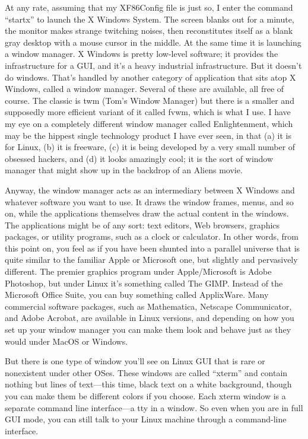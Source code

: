 \documentclass[
  fontsize=11pt,
  paper=landscape,
  twocolumn=true,
  pagesize=pdftex,
  headings=small,
  DIV=15,
  ]{scrartcl}
\begin{document}
At any rate, assuming that my XF86Config file is just so, I enter the
command ``startx'' to launch the X Windows System. The screen blanks out
for a minute, the monitor makes strange twitching noises, then
reconstitutes itself as a blank gray desktop with a mouse cursor in the
middle. At the same time it is launching a window manager. X Windows is
pretty low-level software; it provides the infrastructure for a GUI, and
it's a heavy industrial infrastructure. But it doesn't do windows.
That's handled by another category of application that sits atop X
Windows, called a window manager. Several of these are available, all
free of course. The classic is twm (Tom's Window Manager) but there is a
smaller and supposedly more efficient variant of it called fvwm, which
is what I use. I have my eye on a completely different window manager
called Enlightenment, which may be the hippest single technology product
I have ever seen, in that (a) it is for Linux, (b) it is freeware, (c)
it is being developed by a very small number of obsessed hackers, and
(d) it looks amazingly cool; it is the sort of window manager that might
show up in the backdrop of an Aliens movie.

Anyway, the window manager acts as an intermediary between X Windows and
whatever software you want to use. It draws the window frames, menus,
and so on, while the applications themselves draw the actual content in
the windows. The applications might be of any sort: text editors, Web
browsers, graphics packages, or utility programs, such as a clock or
calculator. In other words, from this point on, you feel as if you have
been shunted into a parallel universe that is quite similar to the
familiar Apple or Microsoft one, but slightly and pervasively different.
The premier graphics program under Apple/Microsoft is Adobe Photoshop,
but under Linux it's something called The GIMP. Instead of the Microsoft
Office Suite, you can buy something called ApplixWare. Many commercial
software packages, such as Mathematica, Netscape Communicator, and Adobe
Acrobat, are available in Linux versions, and depending on how you set
up your window manager you can make them look and behave just as they
would under MacOS or Windows.

But there is one type of window you'll see on Linux GUI that is rare or
nonexistent under other OSes. These windows are called ``xterm'' and
contain nothing but lines of text---this time, black text on a white
background, though you can make them be different colors if you choose.
Each xterm window is a separate command line interface---a tty in a
window. So even when you are in full GUI mode, you can still talk to
your Linux machine through a command-line interface.
\end{document}
